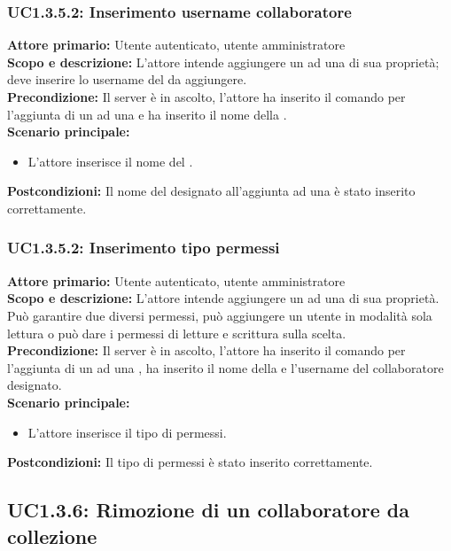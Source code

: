 \documentclass{scalatekids-article}
\begin{document}
\subsubsection{UC1.3.5.2: Inserimento username collaboratore}

\textbf{Attore primario:} Utente autenticato, utente amministratore\\
\textbf{Scopo e descrizione:} L'attore intende aggiungere un  ad una  di sua proprietà; deve inserire lo username del  da aggiungere.\\
\textbf{Precondizione:} Il server è in ascolto, l'attore ha inserito il comando per l'aggiunta di un  ad una  e ha inserito il nome della .\\
\textbf{Scenario principale:}
\begin{itemize}
\item L'attore inserisce il nome del .
\end{itemize}
\textbf{Postcondizioni:} Il nome del  designato all'aggiunta ad una  è stato inserito correttamente.

\subsubsection{UC1.3.5.2: Inserimento tipo permessi}

\textbf{Attore primario:} Utente autenticato, utente amministratore\\
\textbf{Scopo e descrizione:} L'attore intende aggiungere un  ad una  di sua proprietà. Può garantire due diversi permessi, può aggiungere un utente in modalità sola lettura o può dare i permessi di letture e scrittura sulla  scelta.\\
\textbf{Precondizione:} Il server è in ascolto, l'attore ha inserito il comando per l'aggiunta di un  ad una , ha inserito il nome della  e l'username del collaboratore designato.\\
\textbf{Scenario principale:}
\begin{itemize}
\item L'attore inserisce il tipo di permessi.
\end{itemize}
\textbf{Postcondizioni:} Il tipo di permessi è stato inserito correttamente.

\subsection{UC1.3.6: Rimozione di un collaboratore da collezione}
\end{document}

